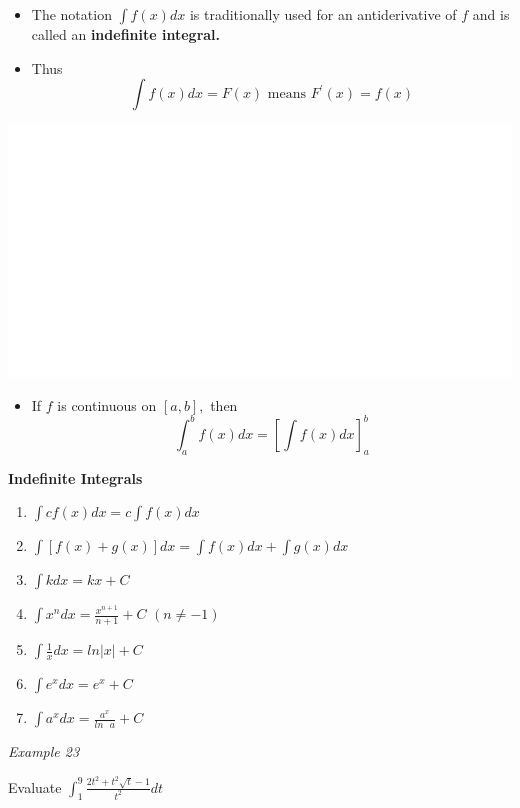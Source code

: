 \documentclass[]{book}
\providecommand{\tightlist}{%
  \setlength{\itemsep}{0pt}\setlength{\parskip}{0pt}}
\begin{document}
\begin{itemize}
\item
  The notation \(\int f(x)dx\) is traditionally used for an antiderivative of \(f\) and is called an \textbf{indefinite integral.}
\item
  Thus
  \[\int f(x) dx = F(x) \text{ means } F^\prime(x) = f(x)\]
\end{itemize}

\begin{center}\includegraphics[width=1\linewidth]{figure/LB40-1} \end{center}

\begin{itemize}
\tightlist
\item
  If \(f\) is continuous on \([a,b],\) then
  \[\int_a^b f(x)dx = \left[\int f(x)dx \right]_a^b\]
\end{itemize}

\textbf{Indefinite Integrals}

\begin{enumerate}
\def\labelenumi{\arabic{enumi}.}
\item
  \(\int cf(x) dx = c\int f(x)dx\)
\item
  \(\int [f(x) +g(x)] dx = \int f(x)dx + \int g(x)dx\)
\item
  \(\int k dx = kx+C\)
\item
  \(\int x^n dx = \frac{x^{n+1}}{n+1}+C\) \((n \neq -1)\)
\item
  \(\int \frac{1}{x} dx = ln|x|+C\)
\item
  \(\int e^xdx= e^x+C\)
\item
  \(\int a^xdx= \frac{a^x}{ln \text{ } a}+C\)
\end{enumerate}

\newpage

\emph{Example 23}

Evaluate \(\int_1^9 \frac{2t^2+t^2\sqrt{t}-1}{t^2} dt\)
\end{document}
